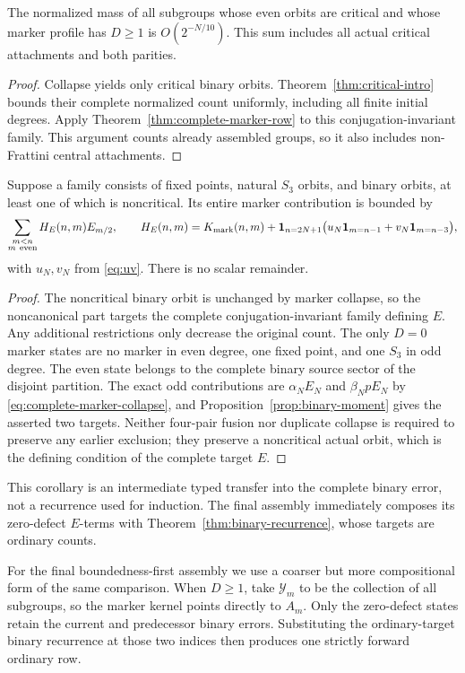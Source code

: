 \begin{corollary}\label{cor:pure-marker-sum}
The normalized mass of all subgroups whose even orbits are critical
and whose marker profile has $D\geq1$ is $O(2^{-N/10})$.
This sum includes all actual critical attachments and both parities.
\end{corollary}
\begin{proof}
Collapse yields only critical binary orbits. Theorem~\ref{thm:critical-intro}
bounds their complete normalized count uniformly, including all finite
initial degrees. Apply Theorem~\ref{thm:complete-marker-row} to this
conjugation-invariant family. This argument counts already assembled groups, so it also
includes non-Frattini central attachments.
\end{proof}

\begin{corollary}
\label{cor:complete-marker-error}
Suppose a family consists of fixed points, natural $S_3$ orbits, and
binary orbits, at least one of which is noncritical. Its entire marker
contribution is bounded by
\[
 \sum_{\substack{m<n\\m\ \mathrm{even}}}H_E(n,m)E_{m/2},
\qquad
 H_E(n,m)=K_{\rm mark}(n,m)+\mathbf1_{n=2N+1}
       \bigl(u_N\mathbf1_{m=n-1}+v_N\mathbf1_{m=n-3}\bigr),
\]
with $u_N,v_N$ from \eqref{eq:uv}. There is no scalar remainder.
\end{corollary}
\begin{proof}
The noncritical binary orbit is unchanged by marker collapse, so the
noncanonical part targets the complete conjugation-invariant family
defining $E$. Any additional restrictions only decrease the original count.
The only $D=0$ marker states are no marker in even degree, one fixed
point, and one $S_3$ in odd degree. The even state belongs to the
complete binary source sector of the disjoint partition. The exact odd
contributions are $\alpha_NE_N$ and $\beta_NpE_N$ by
\eqref{eq:complete-marker-collapse}, and
Proposition~\ref{prop:binary-moment} gives the asserted two targets.
Neither four-pair fusion nor duplicate collapse is required to preserve
any earlier exclusion; they preserve a noncritical actual orbit, which
is the defining condition of the complete target $E$.
\end{proof}

This corollary is an intermediate typed transfer into the complete binary
error, not a recurrence used for induction. The final assembly immediately
composes its zero-defect $E$-terms with
Theorem~\ref{thm:binary-recurrence}, whose targets are ordinary counts.

For the final boundedness-first assembly we use a coarser but more
compositional form of the same comparison.  When $D\geq1$, take
$\mathcal Y_m$ to be the collection of all subgroups, so the marker
kernel points directly to $A_m$.  Only the zero-defect states retain
the current and predecessor binary errors. Substituting the ordinary-target
binary recurrence at those two indices then produces one strictly forward
ordinary row.
